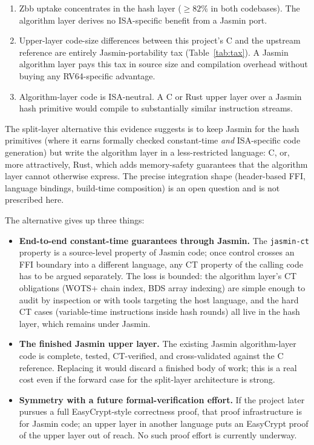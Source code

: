 \documentclass[11pt,a4paper]{article}
\begin{document}
\begin{enumerate}[nosep]
  \item Zbb uptake concentrates in the hash layer ($\geq 82\%$ in
    both codebases). The algorithm layer derives no ISA-specific
    benefit from a Jasmin port.
  \item Upper-layer code-size differences between this project's C
    and the upstream reference are entirely Jasmin-portability tax
    (Table~\ref{tab:tax}). A Jasmin algorithm layer pays this tax in
    source size and compilation overhead without buying any
    RV64-specific advantage.
  \item Algorithm-layer code is ISA-neutral. A C or Rust upper
    layer over a Jasmin hash primitive would compile to substantially
    similar instruction streams.
\end{enumerate}

The split-layer alternative this evidence suggests is to keep
Jasmin for the hash primitives (where it earns formally checked
constant-time \emph{and} ISA-specific code generation) but write
the algorithm layer in a less-restricted language: C, or, more
attractively, Rust, which adds memory-safety guarantees that the
algorithm layer cannot otherwise express. The precise integration
shape (header-based FFI, language bindings, build-time composition)
is an open question and is not prescribed here.

The alternative gives up three things:

\begin{itemize}[nosep]
  \item \textbf{End-to-end constant-time guarantees through
    Jasmin.} The \texttt{jasmin-ct} property is a source-level
    property of Jasmin code; once control crosses an FFI boundary
    into a different language, any CT property of the calling code
    has to be argued separately. The loss is bounded: the algorithm
    layer's CT obligations
    (WOTS+ chain index, BDS array indexing) are simple enough to
    audit by inspection or with tools targeting the host language,
    and the hard CT cases (variable-time instructions inside hash
    rounds) all live in the hash layer, which remains under Jasmin.
  \item \textbf{The finished Jasmin upper layer.} The existing
    Jasmin algorithm-layer code is complete, tested, CT-verified,
    and cross-validated against the C reference. Replacing it would
    discard a finished body of work; this is a real cost even if
    the forward case for the split-layer architecture is strong.
  \item \textbf{Symmetry with a future formal-verification effort.}
    If the project later pursues a full EasyCrypt-style correctness
    proof, that proof infrastructure is for Jasmin code; an upper
    layer in another language puts an EasyCrypt proof of the upper
    layer out of reach. No such proof effort is currently underway.
\end{itemize}
\end{document}
